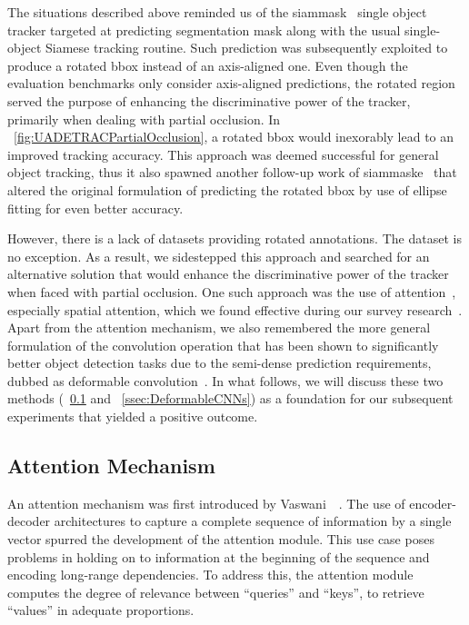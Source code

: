 The situations described above reminded us of the \gls{siammask}~\cite{wang2019siammask} single object tracker targeted at predicting segmentation mask along with the usual single-object Siamese tracking routine. Such prediction was subsequently exploited to produce a rotated \gls{bbox} instead of an axis-aligned one. Even though the evaluation benchmarks only consider axis-aligned predictions, the rotated region served the purpose of enhancing the discriminative power of the tracker, primarily when dealing with partial occlusion. In \figtext{}~\ref{fig:UADETRACPartialOcclusion}, a rotated \gls{bbox} would inexorably lead to an improved tracking accuracy. This approach was deemed successful for general object tracking, thus it also spawned another follow-up work of \gls{siammaske}~\cite{chen2019rotbboxes} that altered the original formulation of predicting the rotated \gls{bbox} by use of ellipse fitting for even better accuracy.

However, there is a lack of datasets providing rotated annotations. The \uadetrac{} dataset is no exception. As a result, we sidestepped this approach and searched for an alternative solution that would enhance the discriminative power of the tracker when faced with partial occlusion. One such approach was the use of attention~\cite{vaswani2017attention}, especially spatial attention, which we found effective during our survey research~\cite{ondrasovic2021siamese}. Apart from the attention mechanism, we also remembered the more general formulation of the convolution operation that has been shown to significantly better object detection tasks due to the semi-dense prediction requirements, dubbed as deformable convolution~\cite{dai2017dcnn}. In what follows, we will discuss these two methods (\sectiontext{}~\ref{ssec:Attention} and \sectiontext{}~\ref{ssec:DeformableCNNs}) as a foundation for our subsequent experiments that yielded a positive outcome.

\subsection{Attention Mechanism}
\label{ssec:Attention}

An attention mechanism was first introduced by Vaswani~\etal{}~\cite{vaswani2017attention}. The use of encoder-decoder architectures to capture a complete sequence of information by a single vector spurred the development of the attention module. This use case poses problems in holding on to information at the beginning of the sequence and encoding long-range dependencies. To address this, the attention module computes the degree of relevance between ``queries'' and ``keys'', to retrieve ``values'' in adequate proportions.

